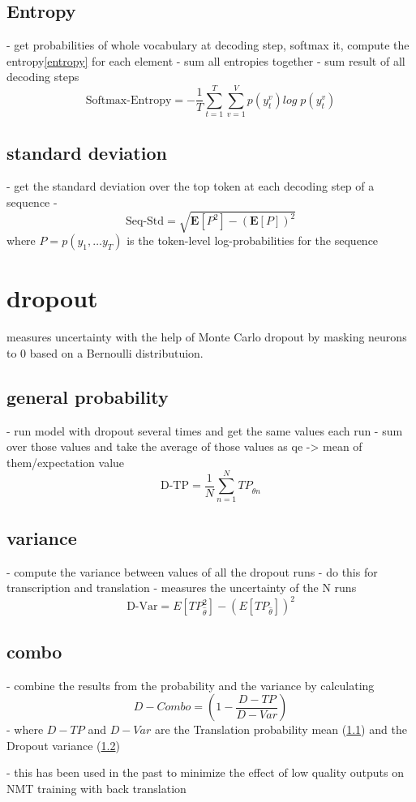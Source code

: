 \subsection{Entropy}
- get probabilities of whole vocabulary at decoding step, softmax it, compute the entropy\ref{entropy} for each element 
- sum all entropies together
- sum result of all decoding steps
$$\text{Softmax-Entropy}=-\frac{1}{T}\sum_{t=1}^T\sum_{v=1}^V p(y_t^v)log\; p(y_t^v)$$

\subsection{standard deviation}
- get the standard deviation over the top token at each decoding step of a sequence
- $$\text{Seq-Std}=\sqrt{\mathbf{E}[P^2]-(\mathbf{E}[P])^2}$$ where $P=p(y_1 , \dots y_T)$ is the token-level log-probabilities for the sequence


\section{dropout}
measures uncertainty with the help of Monte Carlo dropout \cite{gal2016dropoutbayesianapproximationrepresenting} by masking neurons to 0 based on a Bernoulli distributuion. 
\subsection{general probability}
\label{dropoutprob}
- run model with dropout several times and get the same values each run 
- sum over those values and take the average of those values as qe -> mean of them/expectation value
$$\text{D-TP}=\frac{1}{N}\sum_{n=1}^N TP_{\hat\theta n}$$


\subsection{variance}
\label{dropoutvar}
- compute the variance between values of all the dropout runs 
- do this for transcription and translation 
- measures the uncertainty of the N runs 
$$\text{D-Var}=E[TP_{\hat\theta}^2]-(E[TP_{\hat\theta}])^2$$

\subsection{combo}
- combine the results from the probability and the variance by calculating $$D-Combo=(1-\frac{D-TP}{D-Var})$$
- where $D-TP$ and $D-Var$ are the Translation probability mean (\ref{dropoutprob}) and the Dropout variance (\ref{dropoutvar})

- this has been used in the past to minimize the effect of low quality outputs on NMT training with back translation \cite{wang-etal-2018-alibaba} 


